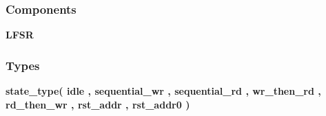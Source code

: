\subsubsection*{Components}
 \begin{DoxyCompactItemize}
\item 
{\bf L\+F\+SR}  {\bfseries }  
\end{DoxyCompactItemize}
\subsubsection*{Types}
 \begin{DoxyCompactItemize}
\item 
{\bfseries {\bf state\+\_\+type}{\bfseries \textcolor{vhdlchar}{(}\textcolor{vhdlchar}{ }\textcolor{vhdlchar}{idle}\textcolor{vhdlchar}{ }\textcolor{vhdlchar}{,}\textcolor{vhdlchar}{ }\textcolor{vhdlchar}{sequential\+\_\+wr}\textcolor{vhdlchar}{ }\textcolor{vhdlchar}{,}\textcolor{vhdlchar}{ }\textcolor{vhdlchar}{sequential\+\_\+rd}\textcolor{vhdlchar}{ }\textcolor{vhdlchar}{,}\textcolor{vhdlchar}{ }\textcolor{vhdlchar}{wr\+\_\+then\+\_\+rd}\textcolor{vhdlchar}{ }\textcolor{vhdlchar}{,}\textcolor{vhdlchar}{ }\textcolor{vhdlchar}{rd\+\_\+then\+\_\+wr}\textcolor{vhdlchar}{ }\textcolor{vhdlchar}{,}\textcolor{vhdlchar}{ }\textcolor{vhdlchar}{rst\+\_\+addr}\textcolor{vhdlchar}{ }\textcolor{vhdlchar}{,}\textcolor{vhdlchar}{ }\textcolor{vhdlchar}{rst\+\_\+addr0}\textcolor{vhdlchar}{ }\textcolor{vhdlchar}{)}\textcolor{vhdlchar}{ }}} 
\end{DoxyCompactItemize}
